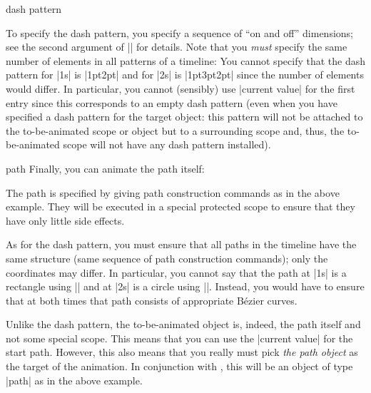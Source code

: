 \begin{animateattribute}{dash pattern}
\begin{codeexample}[width=2.3cm]
\end{codeexample}
  To specify the dash pattern, you specify a sequence of ``on and
  off'' dimensions; see the second argument of |\pgfsetdash| for
  details. Note that you \emph{must} specify the same number of
  elements in all patterns of a timeline: You cannot specify that the
  dash pattern for |1s| is |{1pt}{2pt}| and for |2s| is
  |{1pt}{3pt}{2pt}| since the number of elements would differ. In
  particular, you cannot (sensibly) use |current value| for the first
  entry since this corresponds to an empty dash pattern (even when you
  have specified a dash pattern for the target object: this pattern
  will not be attached to the to-be-animated scope or object but to a
  surrounding scope and, thus, the to-be-animated scope will not have
  any dash pattern installed).
\end{animateattribute}

\begin{animateattribute}{path}
  Finally, you can animate the path itself:
\begin{codeexample}[width=2.3cm]
\end{codeexample}
  The path is specified by giving path construction commands as in the
  above example. They will be executed in a special protected scope to
  ensure that they have only little side effects.

  As for the dash pattern, you must ensure that all paths in the
  timeline have the same structure (same sequence of path construction
  commands); only the coordinates may differ. In particular, you
  cannot say that the path at |1s| is a rectangle using
  |\pgfpathrectangle| and at |2s| is a circle using
  |\pgfpathcircle|. Instead, you would have to ensure that at both
  times that path consists of appropriate Bézier curves.

  Unlike the dash pattern, the to-be-animated object is, indeed, the
  path itself and not some special scope. This means that you can use
  the |current value| for the start path. However, this also means
  that you really must pick \emph{the path object} as the target of
  the animation. In conjunction with \tikzname, this will be an object
  of type |path| as in the above example.
\end{animateattribute}



